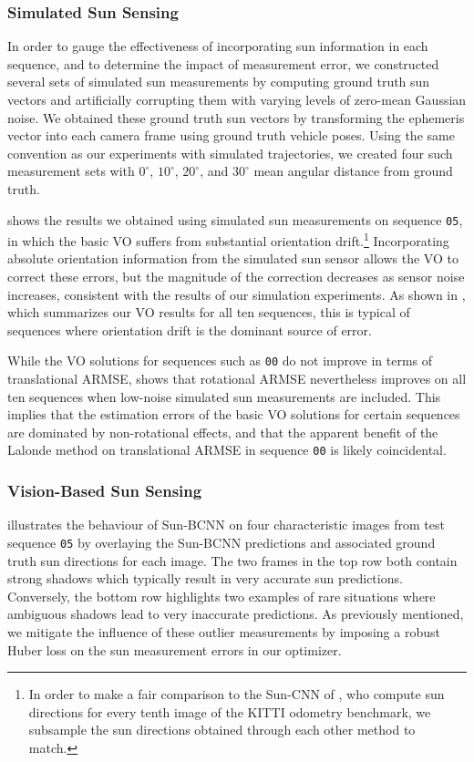 \subsubsection{Simulated Sun Sensing} \label{sec:kitti_vo_sim_sun}
In order to gauge the effectiveness of incorporating sun information in each sequence, and to determine the impact of measurement error, we constructed several sets of simulated sun measurements by computing ground truth sun vectors and artificially corrupting them with varying levels of zero-mean Gaussian noise.
We obtained these ground truth sun vectors by transforming the ephemeris vector into each camera frame using ground truth vehicle poses.
Using the same convention as our experiments with simulated trajectories, we created four such measurement sets with $0^\circ$, $10^\circ$, $20^\circ$, and $30^\circ$ mean angular distance from ground truth.

 shows the results we obtained using simulated sun measurements on sequence \texttt{05}, in which the basic VO suffers from substantial orientation drift.\footnote{In order to make a fair comparison to the Sun-CNN of \citet{Ma2016-at}, who compute sun directions for every tenth image of the KITTI odometry benchmark, we subsample the sun directions obtained through each other method to match.}
Incorporating absolute orientation information from the simulated sun sensor allows the VO to correct these errors, but the magnitude of the correction decreases as sensor noise increases, consistent with the results of our simulation experiments.
As shown in , which summarizes our VO results for all ten sequences, this is typical of sequences where orientation drift is the dominant source of error.

While the VO solutions for sequences such as \texttt{00} do not improve in terms of translational ARMSE,  shows that rotational ARMSE nevertheless improves on all ten sequences when low-noise simulated sun measurements are included.
This implies that the estimation errors of the basic VO solutions for certain sequences are dominated by non-rotational effects, and that the apparent benefit of the Lalonde method on translational ARMSE in sequence \texttt{00} is likely coincidental.

\subsubsection{Vision-Based Sun Sensing} \label{sec:kitti_vo_sim_sun}
 illustrates the behaviour of Sun-BCNN on four characteristic images from test sequence \texttt{05} by overlaying the Sun-BCNN predictions and associated ground truth sun directions for each image.
The two frames in the top row both contain strong shadows which typically result in very accurate sun predictions. 
Conversely, the bottom row highlights two examples of rare situations where ambiguous shadows lead to very inaccurate predictions.
As previously mentioned, we mitigate the influence of these outlier measurements by imposing a robust Huber loss on the sun measurement errors in our optimizer.


